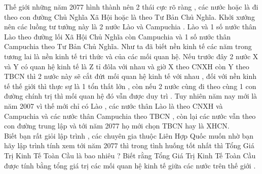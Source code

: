 Thế giới những năm 2077 hình thành nên 2 thái cực rõ ràng , các nước hoặc là đi theo con đường Chủ Nghĩa Xã Hội hoặc là theo Tư Bản Chủ Nghĩa. Khởi xướng nên các luồng tư tưởng này là 2 nước Lào và Campuchia . Lào và 1 số nước thân Lào theo đường lối Xã Hội Chủ Nghĩa còn Campuchia và 1 số nước thân Campuchia theo Tư Bản Chủ Nghĩa. Như ta đã biết nền kinh tế các năm trong tương lai là nền kinh tế tri thức và của các mối quan hệ. Nếu trước đây 2 nước X và Y có quan hệ kinh tế là Z tỉ đôla với nhau và giờ X theo CNXH còn Y theo TBCN thì 2 nước này sẽ cắt đứt mối quan hệ kinh tế với nhau , đối với nền kinh tế thế giới thì thực sự là 1 tổn thất lớn , còn nếu 2 nước cùng đi theo cùng 1 con đường chính trị thì mối quan hệ đó vẫn được duy trì . Tuy nhiên năm nay mới là năm 2007 vì thế mới chỉ có Lào , các nước thân Lào là theo CNXH và Campuchia và các nước thân Campuchia theo TBCN , còn lại các nước vẫn theo con đường trung lập và tới năm 2077 họ mới chọn TBCN hay là XHCN.   
\\   Biết bạn rất giỏi lập trình , các chuyên gia thuộc Liên Hợp Quốc muốn nhờ bạn hãy lập trình tính xem tới năm 2077 thì trong tình huống tốt nhất thì Tổng Giá Trị Kinh Tế Toàn Cầu là bao nhiêu ? Biết rằng Tổng Giá Trị Kinh Tế Toàn Cầu được tính bằng tổng giá trị các mối quan hệ kinh tế giữa các nước trên thế giới .